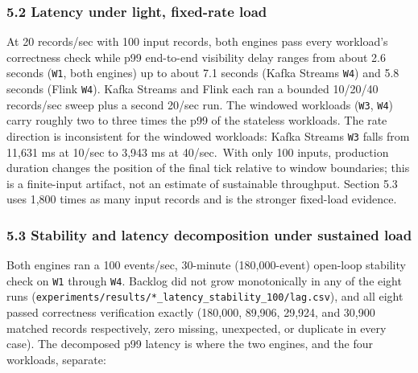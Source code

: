 \documentclass[
]{article}
\begin{document}
\hypertarget{latency-under-light-fixed-rate-load}{%
\subsubsection{5.2 Latency under light, fixed-rate
load}\label{latency-under-light-fixed-rate-load}}

At 20 records/sec with 100 input records, both engines pass every
workload's correctness check while p99 end-to-end visibility delay
ranges from about 2.6 seconds (\texttt{W1}, both engines) up to about
7.1 seconds (Kafka Streams \texttt{W4}) and 5.8 seconds (Flink
\texttt{W4}). Kafka Streams and Flink each ran a bounded 10/20/40
records/sec sweep plus a second 20/sec run. The windowed workloads
(\texttt{W3}, \texttt{W4}) carry roughly two to three times the p99 of
the stateless workloads. The rate direction is inconsistent for the
windowed workloads: Kafka Streams \texttt{W3} falls from 11,631 ms at
10/sec to 3,943 ms at 40/sec.~With only 100 inputs, production duration
changes the position of the final tick relative to window boundaries;
this is a finite-input artifact, not an estimate of sustainable
throughput. Section 5.3 uses 1,800 times as many input records and is
the stronger fixed-load evidence.

\hypertarget{stability-and-latency-decomposition-under-sustained-load}{%
\subsubsection{5.3 Stability and latency decomposition under sustained
load}\label{stability-and-latency-decomposition-under-sustained-load}}

Both engines ran a 100 events/sec, 30-minute (180,000-event) open-loop
stability check on \texttt{W1} through \texttt{W4}. Backlog did not grow
monotonically in any of the eight runs
(\texttt{experiments/results/*\_latency\_stability\_100/lag.csv}), and
all eight passed correctness verification exactly (180,000, 89,906,
29,924, and 30,900 matched records respectively, zero missing,
unexpected, or duplicate in every case). The decomposed p99 latency is
where the two engines, and the four workloads, separate:
\end{document}
